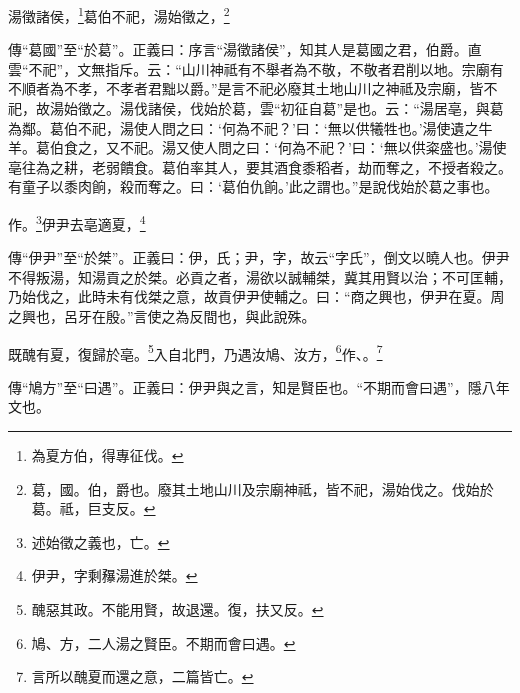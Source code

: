 湯徵諸侯，\footnote{為夏方伯，得專征伐。}葛伯不祀，湯始徵之，\footnote{葛，國。伯，爵也。廢其土地山川及宗廟神祗，皆不祀，湯始伐之。伐始於葛。祗，巨支反。}

{\noindent\shu{}\fzkt 傳“葛國”至“於葛”。正義曰：序言“湯徵諸侯”，知其人是葛國之君，伯爵。直雲“不祀”，文無指斥。云：“山川神祗有不舉者為不敬，不敬者君削以地。宗廟有不順者為不孝，不孝者君黜以爵。”是言不祀必廢其土地山川之神祗及宗廟，皆不祀，故湯始徵之。湯伐諸侯，伐始於葛，雲“初征自葛”是也。云：“湯居亳，與葛為鄰。葛伯不祀，湯使人問之曰：‘何為不祀？’曰：‘無以供犧牲也。’湯使遺之牛羊。葛伯食之，又不祀。湯又使人問之曰：‘何為不祀？’曰：‘無以供粢盛也。’湯使亳往為之耕，老弱饋食。葛伯率其人，要其酒食黍稻者，劫而奪之，不授者殺之。有童子以黍肉餉，殺而奪之。曰：‘葛伯仇餉。’此之謂也。”是說伐始於葛之事也。 \par}

作。\footnote{述始徵之義也，亡。}伊尹去亳適夏，\footnote{伊尹，字剩䂍湯進於桀。}

{\noindent\zhuan{}\fzbyks 傳“伊尹”至“於桀”。正義曰：伊，氏；尹，字，故云“字氏”，倒文以曉人也。伊尹不得叛湯，知湯貢之於桀。必貢之者，湯欲以誠輔桀，冀其用賢以治；不可匡輔，乃始伐之，此時未有伐桀之意，故貢伊尹使輔之。曰：“商之興也，伊尹在夏。周之興也，呂牙在殷。”言使之為反間也，與此說殊。 \par}

既醜有夏，復歸於亳。\footnote{醜惡其政。不能用賢，故退還。復，扶又反。}入自北門，乃遇汝鳩、汝方，\footnote{鳩、方，二人湯之賢臣。不期而會曰遇。}作、。\footnote{言所以醜夏而還之意，二篇皆亡。}

{\noindent\zhuan{}\fzbyks 傳“鳩方”至“曰遇”。正義曰：伊尹與之言，知是賢臣也。“不期而會曰遇”，隱八年文也。 \par}

